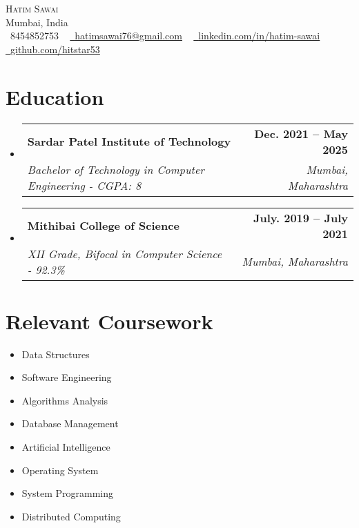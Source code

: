 \documentclass[letterpaper,11pt]{article}
\makeatletter
\newcommand{\resumeSubheading}[4]{
  \vspace{-2pt}\item
    \begin{tabular*}{1.0\textwidth}[t]{l@{\extracolsep{\fill}}r}
      \textbf{#1} & \textbf{\small #2} \\
      \textit{\small#3} & \textit{\small #4} \\
    \end{tabular*}\vspace{-7pt}
}
\newcommand{\resumeSubHeadingListStart}{\begin{itemize}[leftmargin=0.0in, label={}]}
\newcommand{\resumeSubHeadingListEnd}{\end{itemize}}
\makeatother
\begin{document}

\begin{center}
    {\Huge \scshape Hatim Sawai} \\ \vspace{1pt}
    Mumbai, India \\ \vspace{1pt}
    \small \raisebox{-0.1\height}\faPhone\ 8454852753 ~ \href{mailto:x@gmail.com}{\raisebox{-0.2\height}\faEnvelope\  \underline{hatimsawai76@gmail.com}} ~ 
    \href{https://linkedin.com/in//}{\raisebox{-0.2\height}\faLinkedin\ \underline{linkedin.com/in/hatim-sawai}}  ~
    \href{https://github.com/}{\raisebox{-0.2\height}\faGithub\ \underline{github.com/hitstar53}}
    \vspace{-8pt}
\end{center}


\section{Education}
  \resumeSubHeadingListStart
    \resumeSubheading
      {Sardar Patel Institute of Technology}{Dec. 2021 -- May 2025}
      {Bachelor of Technology in Computer Engineering - CGPA: 8}{Mumbai, Maharashtra}
      \resumeSubheading
      {Mithibai College of Science}{July. 2019 -- July 2021}
      {XII Grade, Bifocal in Computer Science - 92.3\% } {Mumbai, Maharashtra}
  \resumeSubHeadingListEnd

\section{Relevant Coursework}
        \begin{multicols}{4}
            \begin{itemize}[itemsep=-5pt, parsep=3pt]
                \item\small Data Structures
                \item Software Engineering
                \item Algorithms Analysis
                \item Database Management
                \item Artificial Intelligence
                \item Operating System
                \item System Programming
                \item Distributed Computing
            \end{itemize}
        \end{multicols}
        \vspace*{2.0\multicolsep}
\end{document}

